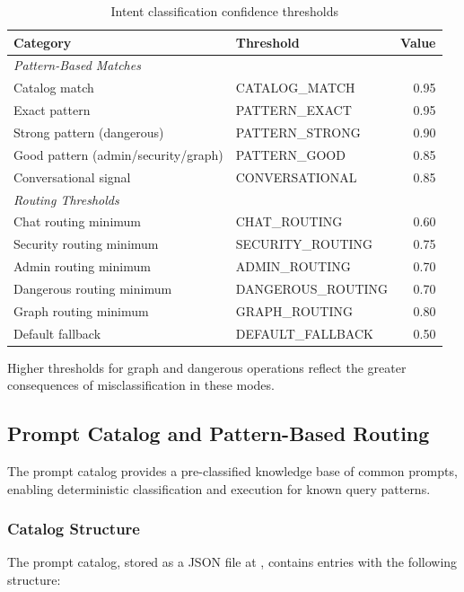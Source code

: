 \documentclass[a4paper,twoside]{sapthesis}
\begin{document}
\begin{table}[htbp]
\centering
\caption{Intent classification confidence thresholds}
\label{tab:confidence-thresholds}
\begin{tabular}{llr}
\hline
\textbf{Category} & \textbf{Threshold} & \textbf{Value} \\
\midrule
\multicolumn{3}{l}{\textit{Pattern-Based Matches}} \\
Catalog match & CATALOG\_MATCH & 0.95 \\
Exact pattern & PATTERN\_EXACT & 0.95 \\
Strong pattern (dangerous) & PATTERN\_STRONG & 0.90 \\
Good pattern (admin/security/graph) & PATTERN\_GOOD & 0.85 \\
Conversational signal & CONVERSATIONAL & 0.85 \\
\midrule
\multicolumn{3}{l}{\textit{Routing Thresholds}} \\
Chat routing minimum & CHAT\_ROUTING & 0.60 \\
Security routing minimum & SECURITY\_ROUTING & 0.75 \\
Admin routing minimum & ADMIN\_ROUTING & 0.70 \\
Dangerous routing minimum & DANGEROUS\_ROUTING & 0.70 \\
Graph routing minimum & GRAPH\_ROUTING & 0.80 \\
\midrule
Default fallback & DEFAULT\_FALLBACK & 0.50 \\
\midrule
\end{tabular}
\end{table}

Higher thresholds for graph and dangerous operations reflect the greater consequences of misclassification in these modes.

\subsection{Prompt Catalog and Pattern-Based Routing}
\label{subsec:prompt-catalog}

The prompt catalog provides a pre-classified knowledge base of common prompts, enabling deterministic classification and execution for known query patterns.

\subsubsection{Catalog Structure}

The prompt catalog, stored as a JSON file at , contains entries with the following structure:
\end{document}
